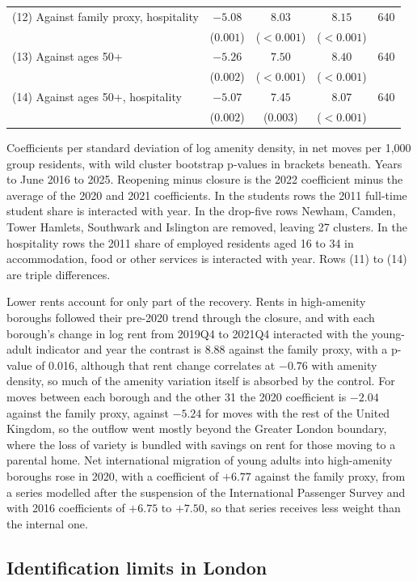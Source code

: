 \documentclass[11pt,a4paper]{article}
\newcommand{\tabnote}[1]{\par\smallskip\parbox{\linewidth}{\footnotesize #1}}
\begin{document}
\begin{table}[htbp]
\begin{tabularx}{\linewidth}{@{}Lcccc@{}}
(12) Against family proxy, hospitality & $-5.08$ & $8.03$ & $8.15$ & 640 \\
 & ($0.001$) & ($<0.001$) & ($<0.001$)  & \\[3pt]
(13) Against ages 50+ & $-5.26$ & $7.50$ & $8.40$ & 640 \\
 & ($0.002$) & ($<0.001$) & ($<0.001$)  & \\[3pt]
(14) Against ages 50+, hospitality & $-5.07$ & $7.45$ & $8.07$ & 640 \\
 & ($0.002$) & ($0.003$) & ($<0.001$)  & \\[3pt]
\bottomrule
\end{tabularx}
\tabnote{Coefficients per standard deviation of log amenity density, in net moves per 1,000 group residents, with wild cluster bootstrap p-values in brackets beneath. Years to June 2016 to 2025. Reopening minus closure is the 2022 coefficient minus the average of the 2020 and 2021 coefficients. In the students rows the 2011 full-time student share is interacted with year. In the drop-five rows Newham, Camden, Tower Hamlets, Southwark and Islington are removed, leaving 27 clusters. In the hospitality rows the 2011 share of employed residents aged 16 to 34 in accommodation, food or other services is interacted with year. Rows (11) to (14) are triple differences.}
\end{table}

Lower rents account for only part of the recovery. Rents in high-amenity boroughs followed their pre-2020 trend through the closure, and with each borough's change in log rent from 2019Q4 to 2021Q4 interacted with the young-adult indicator and year the contrast is 8.88 against the family proxy, with a p-value of 0.016, although that rent change correlates at $-0.76$ with amenity density, so much of the amenity variation itself is absorbed by the control. For moves between each borough and the other 31 the 2020 coefficient is $-2.04$ against the family proxy, against $-5.24$ for moves with the rest of the United Kingdom, so the outflow went mostly beyond the Greater London boundary, where the loss of variety is bundled with savings on rent for those moving to a parental home. Net international migration of young adults into high-amenity boroughs rose in 2020, with a coefficient of $+6.77$ against the family proxy, from a series modelled after the suspension of the International Passenger Survey and with 2016 coefficients of $+6.75$ to $+7.50$, so that series receives less weight than the internal one.

\subsection{Identification limits in London}\label{sec:idlim}
\end{document}
